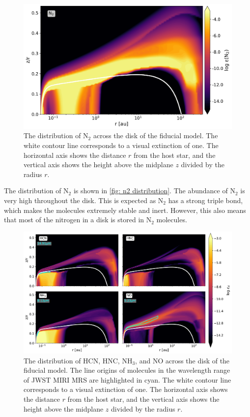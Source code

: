 \documentclass[oneside, single, authoryear, semicolon, 12pt]{lion-msc}
\newcommand{\4}{$_4$}
\newcommand{\3}{$_3$}
\newcommand{\2}{$_2$}
\begin{document}
\begin{figure}[H]
    \centering
    \includegraphics[width=.8\linewidth]{Figures/AbundanceN2.pdf}
    \caption{The distribution of N\2 across the disk of the fiducial model. The white contour line corresponds to a visual extinction of one. The horizontal axis shows the distance $r$ from the host star, and the vertical axis shows the height above the midplane $z$ divided by the radius $r$.}
    \label{fig: n2 distribution}
\end{figure}

The distribution of N\2 is shown in \autoref{fig: n2 distribution}. The abundance of N\2 is very high throughout the disk. This is expected as N\2 has a strong triple bond, which makes the molecules extremely stable and inert. However, this also means that most of the nitrogen in a disk is stored in N\2 molecules. 

\begin{figure}[H]
    \centering
    \includegraphics[width=\linewidth]{Figures/Abundance2.pdf}
    \caption{The distribution of HCN, HNC, NH\3, and NO across the disk of the fiducial model. The line origins of molecules in the wavelength range of JWST MIRI MRS are highlighted in cyan. The white contour line corresponds to a visual extinction of one. The horizontal axis shows the distance $r$ from the host star, and the vertical axis shows the height above the midplane $z$ divided by the radius $r$.}
    \label{fig: nitrogen distribution}
\end{figure}
\end{document}
